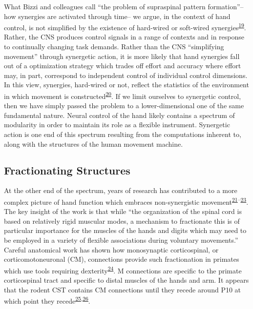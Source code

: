 \documentclass[
  a4paper,
]{article}
\begin{document}
What Bizzi and colleagues call ``the problem of supraspinal pattern
formation''--how synergies are activated through time-- we argue, in the
context of hand control, is not simplified by the existence of
hard-wired or soft-wired
synergies\textsuperscript{\protect\hyperlink{ref-bizziMotorPlanningExecution2020}{19}}.
Rather, the CNS produces control signals in a range of contexts and in
response to continually changing task demands. Rather than the CNS
``simplifying movement'' through synergetic action, it is more likely
that hand synergies fall out of a optimization strategy which trades off
effort and accuracy where effort may, in part, correspond to independent
control of individual control dimensions. In this view, synergies,
hard-wired or not, reflect the statistics of the environment in which
movement is
constructed\textsuperscript{\protect\hyperlink{ref-brutonSynergiesCoordinationComprehensive2018}{20}}.
If we limit ourselves to synergetic control, then we have simply passed
the problem to a lower-dimensional one of the same fundamental nature.
Neural control of the hand likely contains a spectrum of modularity in
order to maintain its role as a flexible instrument. Synergetic action
is one end of this spectrum resulting from the computations inherent to,
along with the structures of the human movement machine.

\hypertarget{fractionating-structures}{%
\subsection{Fractionating Structures}\label{fractionating-structures}}

At the other end of the spectrum, years of research has contributed to a
more complex picture of hand function which embraces non-synergistic
movement\textsuperscript{\protect\hyperlink{ref-lemon1993}{21}--\protect\hyperlink{ref-lemon2008}{23}}.
The key insight of the work is that while ``the organization of the
spinal cord is based on relatively rigid muscular modes, a mechanism to
fractionate this is of particular importance for the muscles of the
hands and digits which may need to be employed in a variety of flexible
associations during voluntary movements.'' Careful anatomical work has
shown how monosynaptic corticospinal, or corticomotoneuronal (CM),
connections provide such fractionation in primates which use tools
requiring
dexterity\textsuperscript{\protect\hyperlink{ref-lemonStartingStoppingMovement2019}{24}}.
M connections are specific to the primate corticospinal tract and
specific to distal muscles of the hands and arm. It appears that the
rodent CST contains CM connections until they recede around P10 at which
point they
recede\textsuperscript{\protect\hyperlink{ref-kawasawa2017}{25},\protect\hyperlink{ref-murabe2018}{26}}.
\end{document}
